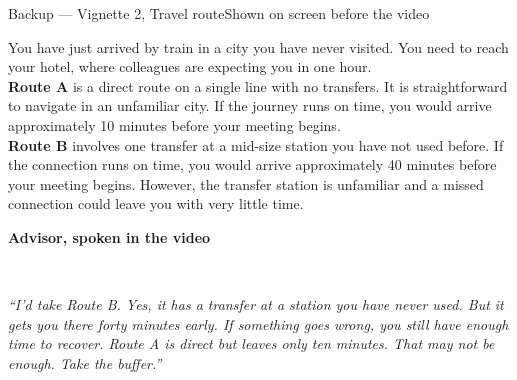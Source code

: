 \documentclass[aspectratio=169,10pt]{beamer}
\newcommand{\panelhead}[1]{\noindent\colorbox{kncyan}{\parbox{0.96\textwidth}{\centering\vspace{1pt}\color{white}\scriptsize\bfseries #1\vspace{1pt}}}\\[0.25em]}
\begin{document}
\begin{frame}{Backup — Vignette 2, Travel route}{Shown on screen before the video}
  \vspace{0.4em}
  \noindent\colorbox{knlight}{\parbox{0.975\textwidth}{\vspace{3pt}\scriptsize
  You have just arrived by train in a city you have never visited. You need to reach your hotel, where colleagues are expecting you in one hour.\\[0.5em]
  \textbf{Route A} is a direct route on a single line with no transfers. It is straightforward to navigate in an unfamiliar city. If the journey runs on time, you would arrive approximately 10 minutes before your meeting begins.\\[0.5em]
  \textbf{Route B} involves one transfer at a mid-size station you have not used before. If the connection runs on time, you would arrive approximately 40 minutes before your meeting begins. However, the transfer station is unfamiliar and a missed connection could leave you with very little time.\vspace{3pt}}}
  \vspace{0.8em}

  \panelhead{Advisor, spoken in the video}
  \noindent\colorbox{knpale}{\parbox{0.975\textwidth}{\vspace{3pt}\scriptsize\itshape
  ``I'd take Route B. Yes, it has a transfer at a station you have never used. But it gets you there forty minutes early. If something goes wrong, you still have enough time to recover. Route A is direct but leaves only ten minutes. That may not be enough. Take the buffer.''\vspace{3pt}}}
\end{frame}
\end{document}
